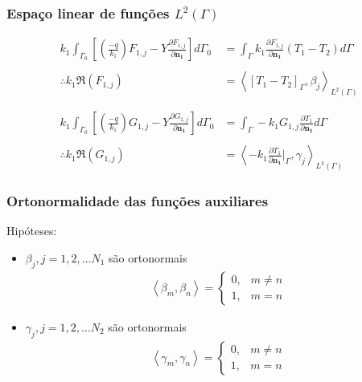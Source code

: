 \documentclass{beamer}
\begin{document}
\begin{frame}
	\frametitle{Espaço linear de funções $L^2(\Gamma)$}
	\begin{alertblock}{}
		\begin{align*}
		k_1\int_{\Gamma_0}\left[\left(\frac{-q}{k_1}\right)F_{1,j} - Y\frac{\partial F_{1,j}}{\partial\mathbf{n_1}}\right]d\Gamma_0
		& =\int_\Gamma k_1 \frac{\partial F_{1,j}}{\partial\mathbf{n_1}}\left(T_1 - T_2\right)d\Gamma
		 \\  \\
		 \therefore k_1 \Re(F_{1,j})
		 & =
		 \left\langle \left[T_1 - T_2\right]_\Gamma, \beta_j\right\rangle _{L^2(\Gamma)}
		 \\ \\ \\
		k_1\int_{\Gamma_0}\left[\left(\frac{-q}{k_1}\right)G_{1,j} -  Y\frac{\partial G_{1,j}}{\partial\mathbf{n_1}}\right]d\Gamma_0
		& = \int_\Gamma -k_1 G_{1,j} \frac{\partial T_1}{\partial\mathbf{n_1}}d\Gamma \\ \\
		\therefore k_1 \Re(G_{1,j})
		& =
		\left\langle  -k_1 \frac{\partial T_1}{\partial\mathbf{n_1}}\bigg|_\Gamma, \gamma_j\right\rangle _{L^2(\Gamma)}
		\end{align*}
	\end{alertblock}
\end{frame}

\begin{frame}
	\frametitle{Ortonormalidade das funções auxiliares}
	Hipóteses:
	\begin{itemize}
		\item $\beta_j, j=1,2,\ldots N_1$ são ortonormais
		\begin{align*}
		\left\langle  \beta_m, \beta_n \right\rangle = \left\lbrace
		\begin{matrix}
		0, & m \neq n \\
		1, & m = n 
		\end{matrix}
		\right.
		\end{align*}
		
		\item $\gamma_j, j=1,2,\ldots N_2$ são ortonormais
		\begin{align*}
		\left\langle  \gamma_m, \gamma_n \right\rangle = \left\lbrace
		\begin{matrix}
		0, & m \neq n \\
		1, & m = n 
		\end{matrix}
		\right.
		\end{align*}
	\end{itemize}
\end{frame}
\end{document}
